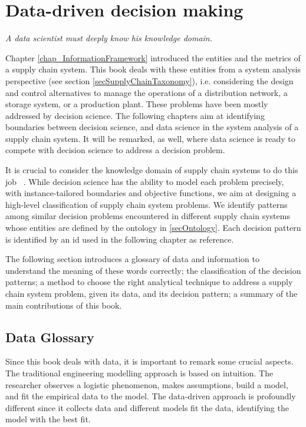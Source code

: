 \chapter{Data-driven decision making}

\epigraph{\textit{A data scientist must deeply know his knowledge domain.}}{}



Chapter \ref{chap_InformationFramework} introduced the entities and the metrics of a supply chain system. This book deals with these entities from a system analysis perspective (see section \ref{secSupplyChainTaxonomy}), i.e. considering the design and control alternatives to manage the operations of a distribution network, a storage system, or a production plant. These problems have been mostly addressed by decision science. The following chapters aim at identifying boundaries between decision science, and data science in the system analysis of a supply chain system. It will be remarked, as well, where data science is ready to compete with decision science to address a decision problem.\par

It is crucial to consider the knowledge domain of supply chain systems to do this job ~\cite{Stadtler2008, Hull2016}. While decision science has the ability to model each problem precisely, with instance-tailored boundaries and objective functions, we aim at designing a high-level classification of supply chain system problems. We identify patterns among similar decision problems encountered in different supply chain systems whose entities are defined by the ontology in \ref{secOntology}. Each decision pattern is identified by an id used in the following chapter as reference.\par

The following section introduces a glossary of data and information to understand the meaning of these words correctly; the classification of the decision patterns; a method to choose the right analytical technique to address a supply chain system problem, given its data, and its decision pattern; a summary of the main contributions of this book.

\section{Data Glossary}

Since this book deals with data, it is important to remark some crucial aspects. The traditional engineering modelling approach is based on intuition. The researcher observes a logistic phenomenon, makes assumptions, build a model, and fit the empirical data to the model. The data-driven approach is profoundly different since it collects data and different models fit the data, identifying the model with the best fit.\par

